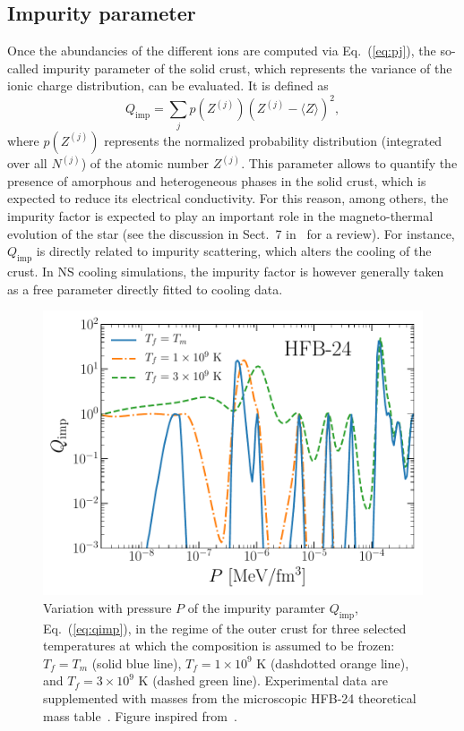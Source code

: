 \subsection{Impurity parameter}\label{subsec:qimp_ocrust}

Once the abundancies of the different ions are computed via Eq.~(\ref{eq:pj}), 
the so-called impurity parameter of the solid crust, which represents the 
variance of the ionic charge distribution, can be evaluated. It is defined
as~\cite{Meisel2018}
%
\begin{equation}
  Q_{\text{imp}} = \sum_j p(Z^{(j)})(Z^{(j)}-\langle Z
  \rangle)^2,\label{eq:qimp}
\end{equation}
%
where $p(Z^{(j)})$ represents the normalized probability distribution 
(integrated over all $N^{(j)}$) of the atomic number $Z^{(j)}$.
This parameter allows to quantify the presence of amorphous and
heterogeneous phases in the solid crust, which is expected to reduce its 
electrical conductivity. For this reason, among others, the impurity factor is 
expected to play an important role in the magneto-thermal evolution of the star 
(see the discussion in Sect.~7 in~\cite{Meisel2018} for a review). For 
instance, $Q_{\text{imp}}$ is directly related to impurity scattering, which 
alters the cooling of the crust.
In NS cooling simulations, the impurity factor is however generally taken as 
a free parameter directly fitted to cooling data.

\begin{figure}[!t]
  \begin{center}
    \includegraphics[width=0.9\linewidth]{figures/qimp_ocrust.pdf}
  \end{center}
  \caption[Impurity parameter versus pressure in the outer crust regime]{
    Variation with pressure $P$ of the impurity paramter $Q_{\text{imp}}$,
    Eq.~(\ref{eq:qimp}), in the regime of the outer crust for three selected
    temperatures at which the composition is assumed to be frozen: 
    $T_f=T_m$ (solid blue line),
    $T_f=1\times 10^9$ K (dashdotted orange line), and 
    $T_f=3\times 10^9$ K (dashed green line).
    Experimental data are supplemented with masses from the microscopic 
    HFB-24 theoretical mass table~\cite{Goriely2013}. 
  Figure inspired from~\cite{Fantina2020}.}\label{fig:qimp_ocrust}
\end{figure}

